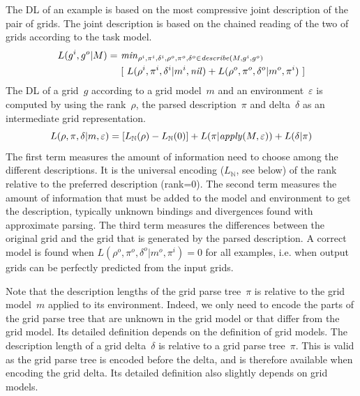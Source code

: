 \documentclass[a4paper]{llncs}
\newcommand{\nat}{\mathbb{N}}
\begin{document}
The DL of an example is based on the most compressive joint
description of the pair of grids. The joint description is based on
the chained reading of the two of grids according to the task
model.
%
\begin{align*}
  L(g^i,g^o|M) =\ & {\it min}_{\rho^i, \pi^i, \delta^i, \rho^o, \pi^o, \delta^o \in {\it describe}(M,g^i,g^o)} \\
                 & [\  L(\rho^i,\pi^i,\delta^i|m^i,{\it nil}) + L(\rho^o,\pi^o,\delta^o|m^o,\pi^i) \ ]
\end{align*}
%
The DL of a grid~$g$ according to a grid model~$m$ and an
environment~$\varepsilon$ is computed by using the rank~$\rho$, the
parsed description~$\pi$ and delta~$\delta$ as an intermediate grid
representation.
\[ L(\rho,\pi,\delta|m,\varepsilon) = [L_\nat(\rho) - L_\nat(0)] + L(\pi|{\it apply}(M,\varepsilon)) + L(\delta|\pi) \]
%
The first term measures the amount of information need to choose among
the different descriptions. It is the universal encoding ($L_\nat$,
see below) of the rank relative to the preferred description
(rank=0). The second term measures the amount of information that must
be added to the model and environment to get the description,
typically unknown bindings and divergences found with approximate
parsing. The third term measures the differences between the original
grid and the grid that is generated by the parsed description.
%
A correct model is found when $L(\rho^o,\pi^o,\delta^o|m^o,\pi^i) = 0$
for all examples, i.e. when output grids can be perfectly predicted
from the input grids.

Note that the description lengths of the grid parse
tree~$\pi$ is relative to the grid model~$m$ applied to its
environment. Indeed, we only need to encode the parts of the grid
parse tree that are unknown in the grid model or that differ from the
grid model. Its detailed definition depends on the definition of grid
models.
%
The description length of a grid delta~$\delta$ is relative to a grid
parse tree~$\pi$. This is valid as the grid parse tree is encoded
before the delta, and is therefore available when encoding the grid
delta. Its detailed definition also slightly depends on grid models.
\end{document}
